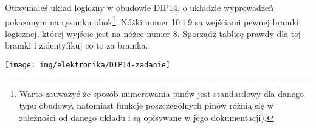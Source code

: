 \dbEntryCheckResults
\noindent\begin{minipage}[t]{\textwidth}
	\noindent\parbox[b]{0.7\textwidth}{
		Otrzymałeś układ logiczny w obudowie DIP14, o układzie wyprowadzeń pokazanym na rysunku obok\footnote{
			Warto zauważyć że sposób numerowania pinów jest standardowy dla danego typu obudowy, natomiast funkcje poszczególnych pinów różnią się w zależności od danego układu i są opisywane w jego dokumentacji).
		}.
		Nóżki numer 10 i 9 są wejściami pewnej bramki logicznej, której wyjście jest na nóżce numer 8. Sporządź tablicę prawdy dla tej bramki i zidentyfikuj co to za bramka.
		\vspace{0.25cm}
	}\hfill\parbox[b]{0.25\textwidth}{
		\texttt{[image: img/elektronika/DIP14-zadanie]}
		\vspace{-0.5cm}
	}
\end{minipage}
\fi
